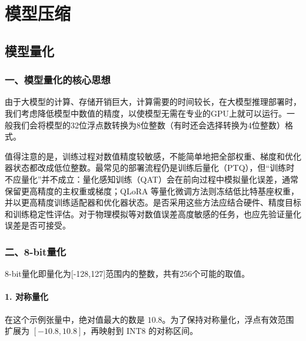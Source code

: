 \hypertarget{ux6a21ux578bux538bux7f29}{%
\chapter{模型压缩}\label{ux6a21ux578bux538bux7f29}}

\hypertarget{ux6a21ux578bux91cfux5316}{%
\section{模型量化}\label{ux6a21ux578bux91cfux5316}}

\hypertarget{ux4e00ux6a21ux578bux91cfux5316ux7684ux6838ux5fc3ux601dux60f3}{%
\subsection{一、模型量化的核心思想}\label{ux4e00ux6a21ux578bux91cfux5316ux7684ux6838ux5fc3ux601dux60f3}}

由于大模型的计算、存储开销巨大，计算需要的时间较长，在大模型推理部署时，我们考虑降低模型中数值的精度，以使模型无需在专业的GPU上就可以运行。一般我们会将模型的32位浮点数转换为8位整数（有时还会选择转换为4位整数）格式。

值得注意的是，训练过程对数值精度较敏感，不能简单地把全部权重、梯度和优化器状态都改成低位整数。最常见的部署流程仍是训练后量化（PTQ），但``训练时不应量化''并不成立：量化感知训练（QAT）会在前向过程中模拟量化误差，通常保留更高精度的主权重或梯度；QLoRA 等量化微调方法则冻结低比特基座权重，并以更高精度训练适配器和优化器状态。是否采用这些方法应结合硬件、精度目标和训练稳定性评估。对于物理模拟等对数值误差高度敏感的任务，也应先验证量化误差是否可接受。

\hypertarget{ux4e8c8-bitux91cfux5316}{%
\subsection{二、8-bit量化}\label{ux4e8c8-bitux91cfux5316}}

8-bit量化即量化为{[}-128,127{]}范围内的整数，共有256个可能的取值。

\hypertarget{ux5bf9ux79f0ux91cfux5316}{%
\subsubsection{1. 对称量化}\label{ux5bf9ux79f0ux91cfux5316}}

在这个示例张量中，绝对值最大的数是 \(10.8\)。为了保持对称量化，浮点有效范围扩展为 \([-10.8, 10.8]\)，再映射到 INT8 的对称区间。

